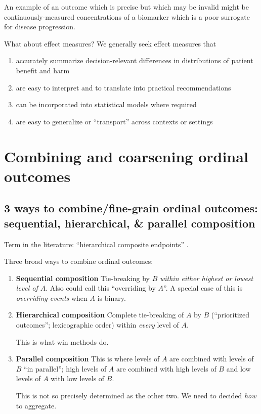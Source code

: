 \documentclass[
  11pt,
  fleqn
]{article}
\begin{document}
An example of an outcome which is precise but which may be invalid
might be continuously-measured concentrations of a biomarker which is a poor
surrogate for disease progression.

What about effect measures? We generally seek effect measures that
\begin{enumerate}
  \item accurately summarize decision-relevant differences in distributions of
    patient benefit and harm
  \item are easy to interpret and to translate into practical recommendations
  \item can be incorporated into statistical models where required
  \item are easy to generalize or ``transport'' across contexts or settings
\end{enumerate}

\section{Combining and coarsening ordinal outcomes}

\subsection{3 ways to combine/fine-grain ordinal outcomes: sequential,
hierarchical, \& parallel composition}

Term in the literature: ``hierarchical composite endpoints''
\citep{gasparyanDesignAnalysisStudies2022}.

Three broad ways to combine ordinal outcomes:
\begin{enumerate}
  \item \textbf{Sequential composition} Tie-breaking by $B$
    \emph{within either highest or lowest level of $A$}. Also could
    call this ``overriding by $A$''. A special case of this is
    \emph{overriding events} when $A$ is binary.
  \item \textbf{Hierarchical composition} Complete tie-breaking of $A$ by
    $B$ (``prioritized outcomes''; lexicographic order) within
    \emph{every} level of $A$.

    This is what win methods do.
  \item \textbf{Parallel composition} This is where levels of $A$ are
    combined with levels of $B$ ``in parallel''; high levels of $A$
    are combined with high levels of $B$ and low levels of $A$ with
    low levels of $B$.

    This is not so precisely determined as the other two. We need to
    decided \emph{how} to aggregate.
\end{enumerate}
\end{document}
